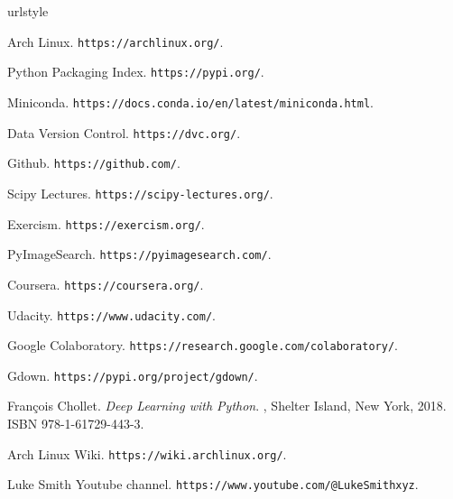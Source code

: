 \documentclass{../template/texnote}
\begin{document}
\begin{thebibliography}{15}
\providecommand{\natexlab}[1]{#1}
\providecommand{\url}[1]{\texttt{#1}}
\expandafter\ifx\csname urlstyle\endcsname\relax
  \providecommand{\doi}[1]{doi: #1}\else
  \providecommand{\doi}{doi: \begingroup \urlstyle{rm}\Url}\fi

{Arch Linux}.
\newblock \url{https://archlinux.org/}.

{Python Packaging Index}.
\newblock \url{https://pypi.org/}.

Miniconda.
\newblock \url{https://docs.conda.io/en/latest/miniconda.html}.

{Data Version Control}.
\newblock \url{https://dvc.org/}.

Github.
\newblock \url{https://github.com/}.

{Scipy Lectures}.
\newblock \url{https://scipy-lectures.org/}.

Exercism.
\newblock \url{https://exercism.org/}.

PyImageSearch.
\newblock \url{https://pyimagesearch.com/}.

Coursera.
\newblock \url{https://coursera.org/}.

Udacity.
\newblock \url{https://www.udacity.com/}.

{Google Colaboratory}.
\newblock \url{https://research.google.com/colaboratory/}.

Gdown.
\newblock \url{https://pypi.org/project/gdown/}.

Fran{\c c}ois Chollet.
\newblock \emph{Deep Learning with {{Python}}}.
, {Shelter Island, New York}, 2018.
\newblock ISBN 978-1-61729-443-3.

{Arch Linux Wiki}.
\newblock \url{https://wiki.archlinux.org/}.

{Luke Smith Youtube channel}.
\newblock \url{https://www.youtube.com/@LukeSmithxyz}.

\end{thebibliography}

\vspace{0.5cm}
\noindent{}
    \printbibliography
\end{document}
